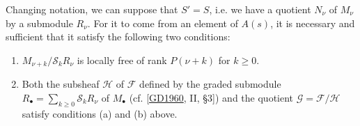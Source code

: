   Changing notation, we can suppose that \(S'=S\), i.e. we have a quotient \(N_\nu \) of \(M_\nu \) by a submodule \(R_\nu \).
  For it to come from an element of \(A(s)\), it is necessary and sufficient that it satisfy the following two conditions:

  
 \begin{enumerate}
    
 \item[i.]
      \(M_{\nu +k}/\mathcal {S}_k R_\nu \) is locally free of rank \(P(\nu +k)\) for \(k\geqslant 0\).
    

    
 \item[ii.]
      Both the subsheaf \(\mathscr {H}\) of \(\mathscr {F}\) defined by the graded submodule \(R_\bullet =\sum _{k\geqslant 0}\mathscr {S}_kR_\nu \) of \(M_\bullet \) (cf. [\hyperref[GD1960]{GD1960}, II, §3]) and the quotient \(\mathscr {G}=\mathscr {F}/\mathscr {H}\) satisfy conditions (a) and (b) above.
    

  \end{enumerate}


